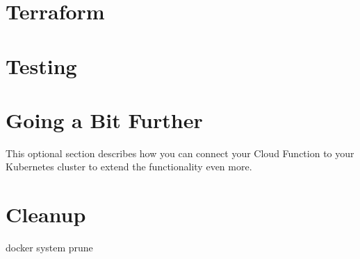 \section{\label{sec:tf}Terraform}

\section{\label{sec:test}Testing}

\section{\label{sec:next}Going a Bit Further}

\justifying
This optional section describes how you can connect your Cloud Function to your Kubernetes cluster to extend the functionality even more.

\section{\label{sec:cleanup}Cleanup}

\justifying

docker system prune


\clearpage
\begin{versionhistory}
\end{versionhistory}

\clearpage




